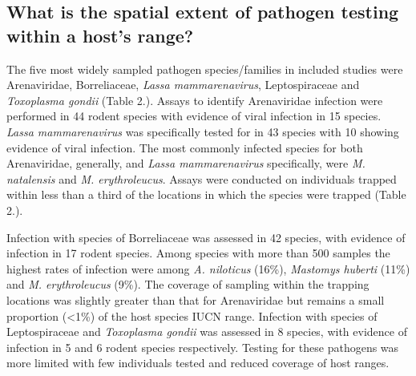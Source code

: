 \documentclass[
]{article}
\begin{document}
\hypertarget{what-is-the-spatial-extent-of-pathogen-testing-within-a-hosts-range-1}{%
\subsection{What is the spatial extent of pathogen testing within a
host's
range?}\label{what-is-the-spatial-extent-of-pathogen-testing-within-a-hosts-range-1}}

The five most widely sampled pathogen species/families in included
studies were Arenaviridae, Borreliaceae, \emph{Lassa mammarenavirus},
Leptospiraceae and \emph{Toxoplasma gondii} (Table 2.). Assays to
identify Arenaviridae infection were performed in 44 rodent species with
evidence of viral infection in 15 species. \emph{Lassa mammarenavirus}
was specifically tested for in 43 species with 10 showing evidence of
viral infection. The most commonly infected species for both
Arenaviridae, generally, and \emph{Lassa mammarenavirus} specifically,
were \emph{M. natalensis} and \emph{M. erythroleucus}. Assays were
conducted on individuals trapped within less than a third of the
locations in which the species were trapped (Table 2.).

Infection with species of Borreliaceae was assessed in 42 species, with
evidence of infection in 17 rodent species. Among species with more than
500 samples the highest rates of infection were among \emph{A.
niloticus} (16\%), \emph{Mastomys huberti} (11\%) and \emph{M.
erythroleucus} (9\%). The coverage of sampling within the trapping
locations was slightly greater than that for Arenaviridae but remains a
small proportion (\textless1\%) of the host species IUCN range.
Infection with species of Leptospiraceae and \emph{Toxoplasma gondii}
was assessed in 8 species, with evidence of infection in 5 and 6 rodent
species respectively. Testing for these pathogens was more limited with
few individuals tested and reduced coverage of host ranges.

\providecommand{\docline}[3]{\noalign{\global\setlength{\arrayrulewidth}{#1}}\arrayrulecolor[HTML]{#2}\cline{#3}}

\setlength{\tabcolsep}{2pt}

\renewcommand*{\arraystretch}{1.5}
\end{document}

